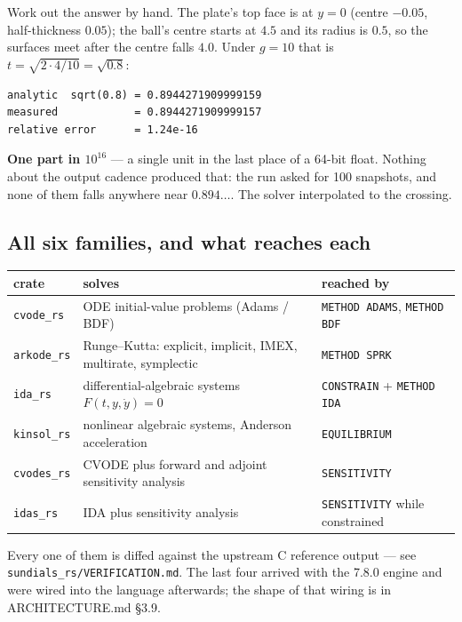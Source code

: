 \documentclass[11pt]{article}
\newcommand{\kw}[1]{\texttt{\uppercase{#1}}}
\newcommand{\code}[1]{\texttt{#1}}
\begin{document}
Work out the answer by hand. The plate's top face is at $y=0$ (centre
$-0.05$, half-thickness $0.05$); the ball's centre starts at $4.5$ and
its radius is $0.5$, so the surfaces meet after the centre falls $4.0$.
Under $g=10$ that is $t=\sqrt{2\cdot 4/10}=\sqrt{0.8}$:

\begin{lstlisting}
analytic  sqrt(0.8) = 0.8944271909999159
measured            = 0.8944271909999157
relative error      = 1.24e-16
\end{lstlisting}

\textbf{One part in $10^{16}$} --- a single unit in the last place of a
64-bit float. Nothing about the output cadence produced that: the run
asked for 100 snapshots, and none of them falls anywhere near
$0.894\ldots$. The solver interpolated to the crossing.

\subsection{All six families, and what reaches each}

\begin{center}
\begin{tabular}{p{2.6cm}p{6.6cm}p{4.6cm}}
\textbf{crate} & \textbf{solves} & \textbf{reached by}\\\hline
\code{cvode\_rs}  & ODE initial-value problems (Adams / BDF) & \kw{method adams}, \kw{method bdf}\\
\code{arkode\_rs} & Runge--Kutta: explicit, implicit, IMEX, multirate, symplectic & \kw{method sprk}\\
\code{ida\_rs}    & differential-algebraic systems $F(t,y,\dot y)=0$ & \kw{constrain} + \kw{method ida}\\
\code{kinsol\_rs} & nonlinear algebraic systems, Anderson acceleration & \kw{equilibrium}\\
\code{cvodes\_rs} & CVODE plus forward and adjoint sensitivity analysis & \kw{sensitivity}\\
\code{idas\_rs}   & IDA plus sensitivity analysis & \kw{sensitivity} while constrained\\
\end{tabular}
\end{center}

Every one of them is diffed against the upstream C reference output ---
see \code{sundials\_rs/VERIFICATION.md}. The last four arrived with the
7.8.0 engine and were wired into the language afterwards; the shape of
that wiring is in ARCHITECTURE.md \S3.9.
\end{document}
